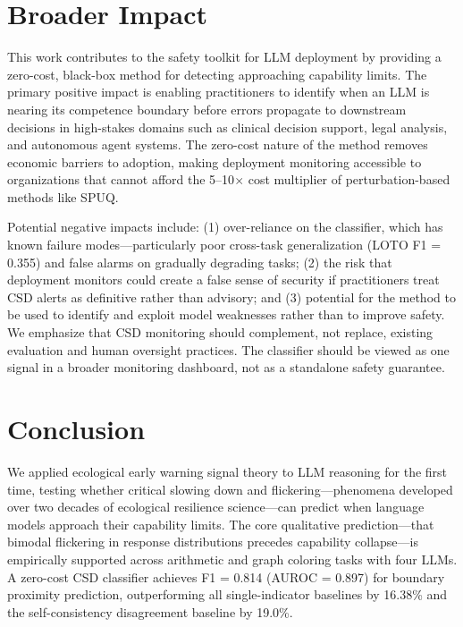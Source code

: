 \documentclass[11pt,letterpaper]{article}
\begin{document}
\section{Broader Impact}
\label{sec:impact}

This work contributes to the safety toolkit for LLM deployment by providing a zero-cost, black-box method for detecting approaching capability limits. The primary positive impact is enabling practitioners to identify when an LLM is nearing its competence boundary before errors propagate to downstream decisions in high-stakes domains such as clinical decision support, legal analysis, and autonomous agent systems. The zero-cost nature of the method removes economic barriers to adoption, making deployment monitoring accessible to organizations that cannot afford the 5--10$\times$ cost multiplier of perturbation-based methods like SPUQ.

Potential negative impacts include: (1) over-reliance on the classifier, which has known failure modes---particularly poor cross-task generalization (LOTO F1 = 0.355) and false alarms on gradually degrading tasks; (2) the risk that deployment monitors could create a false sense of security if practitioners treat CSD alerts as definitive rather than advisory; and (3) potential for the method to be used to identify and exploit model weaknesses rather than to improve safety. We emphasize that CSD monitoring should complement, not replace, existing evaluation and human oversight practices. The classifier should be viewed as one signal in a broader monitoring dashboard, not as a standalone safety guarantee.

\section{Conclusion}
\label{sec:conclusion}

We applied ecological early warning signal theory to LLM reasoning for the first time, testing whether critical slowing down and flickering---phenomena developed over two decades of ecological resilience science---can predict when language models approach their capability limits. The core qualitative prediction---that bimodal flickering in response distributions precedes capability collapse---is empirically supported across arithmetic and graph coloring tasks with four LLMs. A zero-cost CSD classifier achieves F1 = 0.814 (AUROC = 0.897) for boundary proximity prediction, outperforming all single-indicator baselines by 16.38\% and the self-consistency disagreement baseline by 19.0\%.
\end{document}
